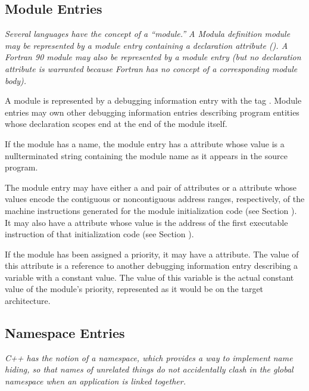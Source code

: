 \subsection{Module Entries}
\label{chap:moduleentries}
\textit{Several languages have the concept of a ``module.''
A Modula definition module may be represented by a module
entry containing a declaration attribute (). A
Fortran 90 module may also be represented by a module entry
(but no declaration attribute is warranted because Fortran
has no concept of a corresponding module body).}

A module is represented by a debugging information entry
with the 
tag .  
Module entries may own other
debugging information entries describing program entities
whose declaration scopes end at the end of the module itself.

If the module has a name, the module entry has a 
attribute whose value is a null\dash terminated string containing
the module name as it appears in the source program.

The module entry may have either a  and
 pair of attributes or a  attribute
whose values encode the contiguous or non\dash contiguous address
ranges, respectively, of the machine instructions generated for
the module initialization code 
(see Section ). 
It may also
have a  attribute whose value is the address of
the first executable instruction of that initialization code
(see Section ).

If the module has been assigned a priority, it may have a
 attribute. The value of this attribute is a
reference to another debugging information entry describing
a variable with a constant value. The value of this variable
is the actual constant value of the module’s priority,
represented as it would be on the target architecture.

\subsection{Namespace Entries}
\label{chap:namespaceentries}
\textit{C++ has the notion of a namespace, which provides a way to
implement name hiding, so that names of unrelated things
do not accidentally clash in the global namespace when an
application is linked together.}

